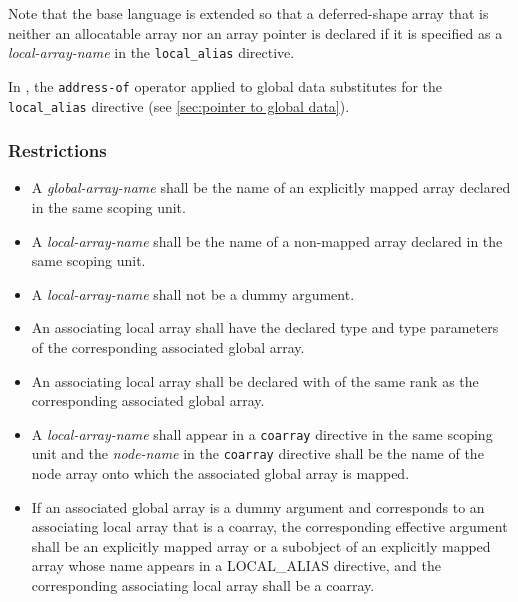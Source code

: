 Note that the base language {\Fort} is extended so that a deferred-shape
array that is neither an allocatable array nor an array pointer is
declared if it is specified as a 
{\it local-array-name} in the {\tt local\_alias} directive.

In {\XMPC}, the {\tt address-of} operator applied to global data
substitutes for the {\tt local\_alias} directive (see \ref{sec:pointer
to global data}).


\subsubsection*{Restrictions}

\begin{itemize}
 \item A {\it global-array-name} shall be the name of an explicitly
       mapped array declared in the same scoping unit. 

 \item A {\it local-array-name} shall be the name of a non-mapped array
       declared in the same scoping unit. 

 \item A {\it local-array-name} shall not be a dummy argument.

 \item An associating local array shall have the declared type and type parameters of
       the corresponding associated global array.

 \item An associating local array shall be declared with
        of the
       same rank as the corresponding associated global array.

 \item A {\it local-array-name} shall appear in a {\tt coarray}
       directive in the same scoping unit and the {\it node-name} in the
       {\tt coarray} directive 
       shall be the name of the node array onto which the
       associated global array is mapped.

 \item 
If an associated global array is a dummy argument and corresponds to
an associating local array that is a coarray, 
the corresponding effective argument shall be
an explicitly mapped array or a subobject of 
an explicitly mapped array whose name appears
in a LOCAL\_ALIAS directive, %
and the corresponding associating local array shall be a coarray.


\end{itemize}
